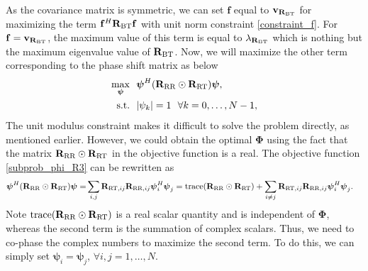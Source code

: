 \documentclass[journal,draftclsnofoot,onecolumn,12pt]{IEEEtran}
\begin{document}
As the covariance matrix is symmetric, we can set $\mathbf{f}$ equal to $\mathbf{v_{R_{\rm BT}}}$ for maximizing the term $\mathbf{f}^H\mathbf{R}_{\rm BT}\mathbf{f}$ with unit norm constraint \eqref{constraint_f}. For  $\mathbf{f}=\mathbf{v_{R_{\rm BT}}}$, the  maximum value of this term is equal to  $\lambda_{\mathbf{R}_{\rm BT}}$ which is nothing but the maximum eigenvalue value of $\mathbf{R}_{\rm BT}$.
Now, we will maximize the other term corresponding to the phase shift matrix as below
\begin{subequations}
    \begin{align}
    \max_{\boldsymbol{\psi}}  ~~& \boldsymbol{\psi}^H(\mathbf{R}_{\rm RR} \odot \mathbf{R}_{\rm RT})\boldsymbol{\psi}, \label{subprob_phi_R3}\\
   \text{s.t.} ~~& |\mathbf{\psi}_k| = 1 ~~ \forall k = 0,\ldots,N-1,
    \end{align}\label{OptProb_Phi_R3}
\end{subequations}
\vspace{-0.1cm}
The unit modulus constraint makes it difficult to solve the problem directly, as mentioned earlier. However, we could obtain the optimal $\mathbf{\Phi}$ using the fact that the matrix $\mathbf{R}_{\rm RR}\odot\mathbf{R}_{\rm RT}$ in the objective function is a real. 
The objective function \eqref{subprob_phi_R3} can be rewritten as
    \begin{align*}
        \boldsymbol{\psi}^H(\mathbf{R}_{\rm RR} \odot \mathbf{R}_{\rm RT})\boldsymbol{\psi}=& \sum_{i,j}\mathbf{R}_{{\rm RT},{ij}}\mathbf{R}_{{\rm RR},{ij}}\boldsymbol{\psi}_i^H\boldsymbol{\psi}_j
        = {\rm trace}(\mathbf{R}_{\rm RR}\odot\mathbf{R}_{\rm RT}) + \sum_{i\neq j}\mathbf{R}_{{\rm RT},{ij}}\mathbf{R}_{{\rm RR},{ij}}\boldsymbol{\psi}_i^H\boldsymbol{\psi}_j.\label{phi_int} 
    \end{align*}
Note ${\rm trace}(\mathbf{R}_{\rm RR}\odot\mathbf{R}_{\rm RT})$ is a real scalar quantity and is independent of $\mathbf{\Phi}$, whereas the second term is the summation of complex scalars. Thus, we need to co-phase the complex numbers to maximize the second term. To do this, we can simply set $\boldsymbol{\psi}_i = \boldsymbol{\psi}_j$, $\forall i,j=1,\dots,N$.
\end{document}
